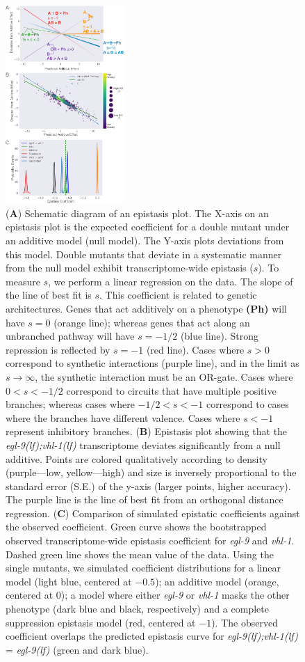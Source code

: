 \documentclass[9pt,twocolumn,twoside,lineno]{pnas-new}
\newcommand{\gene}[1]{\emph{#1}}
\newcommand{\egl}{\emph{\mbox{egl-9}(lf)}}
\newcommand{\eglvhl}{\emph{\mbox{egl-9(lf);vhl-1(lf)}}}
\begin{document}
\begin{figure}[tbhp]
\centering
\includegraphics[width=0.4\textwidth]{../figs/egl9vhl1-epistasis.pdf}
\caption{
(\textbf{A}) Schematic diagram of an epistasis plot. The X-axis on an epistasis
plot is the expected coefficient for a double mutant under an additive model
(null model). The Y-axis plots deviations from this model. Double mutants that
deviate in a systematic manner from the null model exhibit transcriptome-wide
epistasis ($s$). To measure $s$, we perform a linear regression on the data. The
slope of the line of best fit is $s$. This coefficient is related to genetic
architectures. Genes that act additively on a phenotype \textbf{(Ph)} will have
$s=0$ (orange line); whereas genes that act along an unbranched pathway will have
$s=-1/2$ (blue line). Strong repression is reflected by $s=-1$ (red line). Cases
where $s>0$ correspond to synthetic interactions (purple line), and in the limit
as $s\rightarrow\infty$, the synthetic interaction must be an OR-gate. Cases
where $0 < s < -1/2$ correspond to circuits that have multiple positive branches;
whereas cases where $-1/2<s< -1$ correspond to cases where the branches have
different valence. Cases where $s < -1$ represent inhibitory branches.
(\textbf{B}) Epistasis plot showing
that the \eglvhl{} transcriptome deviates significantly from a null additive.
Points are colored qualitatively according to density (purple---low,
yellow---high) and size is inversely proportional to the standard
error (S.E.) of the y-axis (larger points, higher accuracy). The purple line
is the line of best fit from an orthogonal distance regression.
(\textbf{C}) Comparison of simulated epistatic coefficients against the observed
coefficient. Green curve shows the bootstrapped observed transcriptome-wide
epistasis coefficient for \gene{egl-9} and \gene{vhl-1}. Dashed green line shows
the mean value of the data. Using the single mutants, we simulated coefficient
distributions for a linear model (light blue, centered at $-0.5$); an additive
model (orange, centered at 0); a model where either \gene{egl-9} or \gene{vhl-1}
masks the other phenotype (dark blue and black, respectively) and a complete
suppression epistasis model (red, centered at $-1$). The observed coefficient
overlaps the predicted epistasis curve for \eglvhl{} = \egl{} (green and dark
blue).
}
\label{fig:egl9epistasis}
\end{figure}
\end{document}
